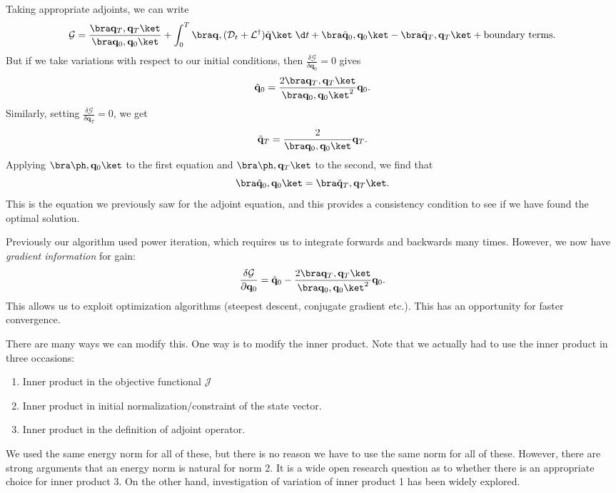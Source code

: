 \documentclass[a4paper]{article}
\begin{document}
Taking appropriate adjoints, we can write
\[
  \mathcal{G} = \frac{\bra \mathbf{q}_T, \mathbf{q}_T\ket}{\bra \mathbf{q}_0, \mathbf{q}_0\ket} + \int_0^T \bra \mathbf{q}, (\mathcal{D}_t + \mathcal{L}^\dagger) \tilde{\mathbf{q}}\ket \;\d t + \bra \tilde{\mathbf{q}}_0, \mathbf{q}_0\ket - \bra \tilde{\mathbf{q}}_T, \mathbf{q}_T\ket + \text{boundary terms}.
\]
But if we take variations with respect to our initial conditions, then $\frac{\delta \mathcal{G}}{\delta \mathbf{q}_0} = 0$ gives
\[
  \tilde{\mathbf{q}}_0 = \frac{2 \bra \mathbf{q}_T, \mathbf{q}_T\ket}{\bra \mathbf{q}_0, \mathbf{q}_0\ket^2} \mathbf{q}_0.
\]
Similarly, setting $\frac{\delta \mathcal{G}}{\delta \mathbf{q}_T} = 0$, we get
\[
  \tilde{\mathbf{q}}_T = \frac{2}{\bra \mathbf{q}_0, \mathbf{q}_0\ket }\mathbf{q}_T.
\]
Applying $\bra \ph, \mathbf{q}_0\ket$ to the first equation and $\bra \ph, \mathbf{q}_T\ket$ to the second, we find that
\[
  \bra \tilde{\mathbf{q}}_0, \mathbf{q}_0\ket = \bra \tilde{\mathbf{q}}_T, \mathbf{q}_T\ket.
\]
This is the equation we previously saw for the adjoint equation, and this provides a consistency condition to see if we have found the optimal solution.

Previously our algorithm used power iteration, which requires us to integrate forwards and backwards many times. However, we now have \emph{gradient information} for gain:
\[
  \frac{\delta \mathcal{G}}{\partial \mathbf{q}_0} = \tilde{\mathbf{q}}_0 - \frac{2 \bra \mathbf{q}_T, \mathbf{q}_T\ket}{\bra \mathbf{q}_0, \mathbf{q}_0\ket^2}\mathbf{q}_0.
\]
This allows us to exploit optimization algorithms (steepest descent, conjugate gradient etc.). This has an opportunity for faster convergence.

There are many ways we can modify this. One way is to modify the inner product. Note that we actually had to use the inner product in three occasions:
\begin{enumerate}
  \item Inner product in the objective functional $\mathcal{J}$
  \item Inner product in initial normalization/constraint of the state vector.
  \item Inner product in the definition of adjoint operator.
\end{enumerate}
We used the same energy norm for all of these, but there is no reason we have to use the same norm for all of these. However, there are strong arguments that an energy norm is natural for norm 2. It is a wide open research question as to whether there is an appropriate choice for inner product 3. On the other hand, investigation of variation of inner product 1 has been widely explored.
\end{document}
